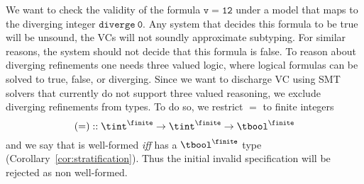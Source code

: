 We want to check the validity of the formula $\mathtt{v = 12}$
under a model that maps \ttv to the diverging integer $\mathtt{diverge \ 0}$.
%
Any system that decides this formula to be true
will be unsound, \ie the VCs will not soundly approximate subtyping.
%
For similar reasons, the system should not decide that this formula is false.
%
To reason about diverging refinements one needs three valued logic, 
where logical formulas can be solved to true, false, or diverging.
%
Since we want to discharge VC using SMT solvers that currently do not support 
three valued reasoning, we exclude diverging refinements from types.
%
To do so, we restrict $\mathtt{=}$ to finite integers
$$ (\mathtt{=}) :: {\tint^{\finite}}\rightarrow{\tint^\finite}\rightarrow{\tbool^\finite}$$
and we say that  
is well-formed \emph{iff}  has a $\tbool^\finite$ type (Corollary~\ref{cor:stratification}).
%
Thus the initial invalid specification will be rejected as non well-formed.

%



